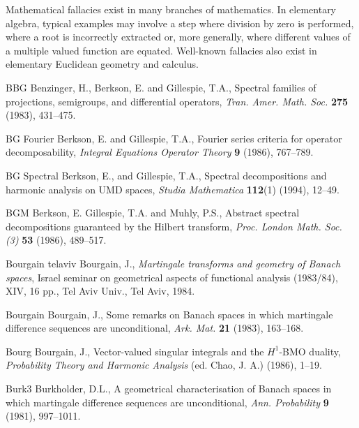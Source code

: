 \documentclass[honours,12pt]{unswthesis}
\numberwithin{equation}{section}
\begin{document}
\noindent Mathematical fallacies exist in many branches of mathematics. In elementary algebra, typical examples may involve a step where division by zero is performed, where a root is incorrectly extracted or, more generally, where different values of a multiple valued function are equated. Well-known fallacies also exist in elementary Euclidean geometry and calculus.








\clearpage
{}


\begin{thebibliography}{999}

\bibitem
{BBG} Benzinger, H., Berkson, E. and Gillespie, T.A.,
Spectral families of projections, semigroups, and differential operators,
\textit{Tran. Amer. Math. Soc.} \textbf{275} (1983), 431--475.

\bibitem
{BG Fourier} Berkson, E. and Gillespie, T.A.,
Fourier series criteria for operator decomposability,
\textit{Integral Equations Operator Theory} \textbf{9} (1986), 767--789.

\bibitem
{BG Spectral} Berkson, E., and Gillespie, T.A.,
Spectral decompositions and harmonic analysis on UMD spaces,
\textit{Studia Mathematica} \textbf{112}(1) (1994), 12--49.

\bibitem
{BGM} Berkson, E. Gillespie, T.A. and Muhly, P.S.,
Abstract spectral decompositions guaranteed by the Hilbert transform,
\textit{Proc. London Math. Soc. (3)} \textbf{53} (1986), 489--517.

\bibitem
{Bourgain telaviv} 
Bourgain, J., {\em Martingale transforms and geometry of Banach spaces},
Israel seminar on geometrical aspects of functional analysis
(1983/84), XIV, 16 pp., Tel Aviv Univ., Tel Aviv, 1984.

\bibitem
{Bourgain} Bourgain, J.,
Some remarks on Banach spaces in which martingale difference sequences are
unconditional,
\textit{Ark. Mat.} \textbf{21} (1983), 163--168.

\bibitem
{Bourg} Bourgain, J.,
Vector-valued singular integrals and the $H^1$-BMO duality,
\textit{Probability Theory and Harmonic Analysis} (ed. Chao, J. A.) (1986), 
1--19.

\bibitem
{Burk3} Burkholder, D.L.,
A geometrical characterisation of Banach spaces in which martingale difference
sequences are unconditional,
\textit{Ann. Probability} \textbf{9} (1981), 997--1011.


\end{thebibliography}
\end{document}
